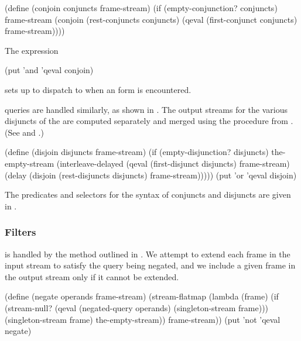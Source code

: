 \begin{codeBlock}
(define (conjoin conjuncts frame-stream)
  (if (empty-conjunction? conjuncts)
      frame-stream
      (conjoin (rest-conjuncts conjuncts)
               (qeval (first-conjunct conjuncts) frame-stream))))
\end{codeBlock}

\noindent
The expression

\begin{codeBlock}
(put 'and 'qeval conjoin)
\end{codeBlock}

\noindent
sets up  to dispatch to  when an  form is
encountered.

 queries are handled similarly, as shown in .  The
output streams for the various disjuncts of the  are computed
separately and merged using the  procedure from
.  (See  and .)

\begin{codeBlock}
(define (disjoin disjuncts frame-stream)
  (if (empty-disjunction? disjuncts)
      the-empty-stream
      (interleave-delayed
       (qeval (first-disjunct disjuncts) frame-stream)
       (delay (disjoin (rest-disjuncts disjuncts) frame-stream)))))
(put 'or 'qeval disjoin)
\end{codeBlock}

\noindent
The predicates and selectors for the syntax of conjuncts and disjuncts are
given in .

\subsubsection*{Filters}

 is handled by the method outlined in .  We
attempt to extend each frame in the input stream to satisfy the query being
negated, and we include a given frame in the output stream only if it cannot be
extended.

\begin{codeBlock}
(define (negate operands frame-stream)
  (stream-flatmap
   (lambda (frame)
     (if (stream-null?
          (qeval (negated-query operands)
                 (singleton-stream frame)))
         (singleton-stream frame)
         the-empty-stream))
   frame-stream))
(put 'not 'qeval negate)
\end{codeBlock}

